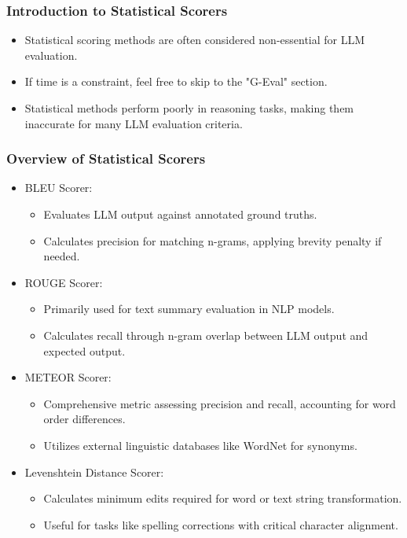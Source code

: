 \begin{frame}[fragile]\frametitle{Introduction to Statistical Scorers}
  \begin{itemize}
    \item Statistical scoring methods are often considered non-essential for LLM evaluation.
    \item If time is a constraint, feel free to skip to the "G-Eval" section.
    \item Statistical methods perform poorly in reasoning tasks, making them inaccurate for many LLM evaluation criteria.
  \end{itemize}
\end{frame}

\begin{frame}[fragile]\frametitle{Overview of Statistical Scorers}
  \begin{itemize}
    \item BLEU Scorer:
      \begin{itemize}
        \item Evaluates LLM output against annotated ground truths.
        \item Calculates precision for matching n-grams, applying brevity penalty if needed.
      \end{itemize}
    \item ROUGE Scorer:
      \begin{itemize}
        \item Primarily used for text summary evaluation in NLP models.
        \item Calculates recall through n-gram overlap between LLM output and expected output.
      \end{itemize}
    \item METEOR Scorer:
      \begin{itemize}
        \item Comprehensive metric assessing precision and recall, accounting for word order differences.
        \item Utilizes external linguistic databases like WordNet for synonyms.
      \end{itemize}
    \item Levenshtein Distance Scorer:
      \begin{itemize}
        \item Calculates minimum edits required for word or text string transformation.
        \item Useful for tasks like spelling corrections with critical character alignment.
      \end{itemize}
  \end{itemize}
\end{frame}

